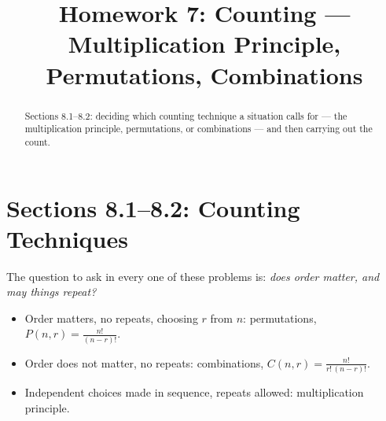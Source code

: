 \documentclass[12pt]{ximera}
\title{Homework 7: Counting --- Multiplication Principle, Permutations, Combinations}
\begin{document}
\begin{abstract}
Sections 8.1--8.2: deciding which counting technique a situation calls for --- the
multiplication principle, permutations, or combinations --- and then carrying out the
count.
\end{abstract}
\maketitle

\section*{Sections 8.1--8.2: Counting Techniques}

The question to ask in every one of these problems is: \emph{does order matter, and
may things repeat?}
\begin{itemize}
\item Order matters, no repeats, choosing $r$ from $n$: permutations,
      $P(n,r)=\frac{n!}{(n-r)!}$.
\item Order does not matter, no repeats: combinations,
      $C(n,r)=\frac{n!}{r!\,(n-r)!}$.
\item Independent choices made in sequence, repeats allowed: multiplication
      principle.
\end{itemize}
\end{document}
